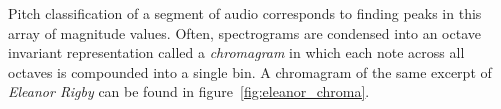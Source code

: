 Pitch classification of a segment of audio corresponds to finding peaks in this array of magnitude values. Often, spectrograms are condensed into an octave invariant representation called a \textit{chromagram} in which each note across all octaves is compounded into a single bin. A chromagram of the same excerpt of \textit{Eleanor Rigby} can be found in figure~\ref{fig:eleanor_chroma}.